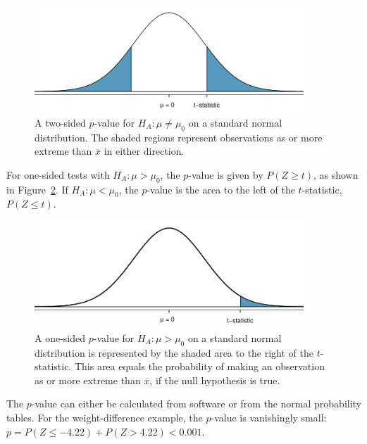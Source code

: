 \begin{figure}[h]
	\centering
	\includegraphics[width=0.9\textwidth]{ch_inference_foundations_oi_biostat/figures/pValueTwoSided/pValueTwoSided}
	\caption{A two-sided $p$-value for $H_A: \mu \neq \mu_0$ on a standard normal distribution. The shaded regions represent observations as or more extreme than $\overline{x}$ in either direction.}
	\label{pValueTwoSided}
\end{figure}

For one-sided tests with $H_A: \mu > \mu_0$, the $p$-value is given by $P(Z \geq t)$, as shown in Figure~\ref{pValueOneSided}. If $H_A: \mu < \mu_0$, the $p$-value is the area to the left of the $t$-statistic, $P(Z \leq t)$.

\begin{figure}[h]
	\centering
	\includegraphics[width=0.9\textwidth]{ch_inference_foundations_oi_biostat/figures/pValueOneSided/pValueOneSided}
	\caption{A one-sided $p$-value for $H_A: \mu > \mu_0$ on a standard normal distribution is represented by the shaded area to the right of the $t$-statistic. This area equals the probability of making an observation as or more extreme than $\overline{x}$, if the null hypothesis is true.}
	\label{pValueOneSided}
\end{figure}


The $p$-value can either be calculated from software or from the normal probability tables. For the weight-difference example, the $p$-value is vanishingly small: $p = P(Z \leq - 4.22) + P(Z > 4.22)< 0.001$.


\textD{\newpage}


